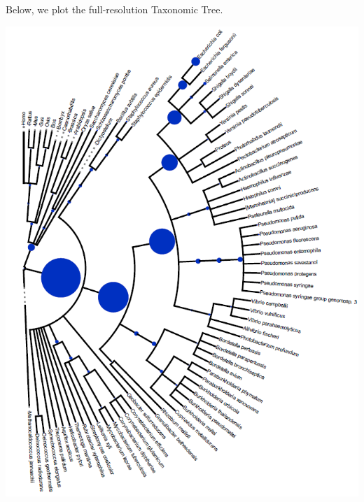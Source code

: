 \documentclass[10pt,twocolumn,letterpaper]{article}
\begin{document}
Below, we plot the full-resolution Taxonomic Tree. \\
\begin{center}
    \includegraphics[]{report/img/taxonomy_tree.png}
\end{center}
\end{document}
